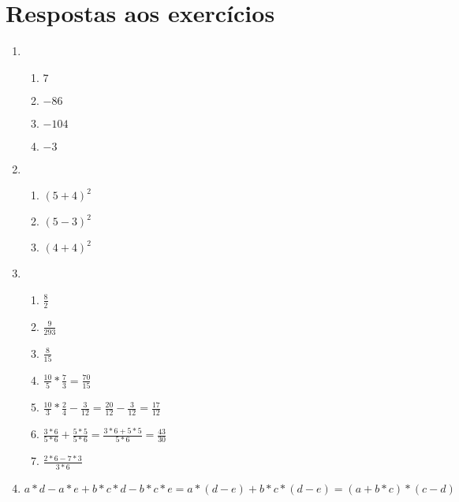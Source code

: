 \documentclass[11pt]{article}
\begin{document}
\section{Respostas aos exercícios}
\begin{enumerate}
	\item 
	\begin{enumerate}
		\item $7$
		\item $-86$
		\item $-104$
		\item $-3$
	\end{enumerate} 

	\item 
	\begin{enumerate}
		\item ${(5 + 4)}^2$
		\item ${(5 - 3)}^2$
		\item ${(4 + 4)}^2$
	\end{enumerate}

	\item
	\begin{enumerate}
		\item $\frac{8}{2}$
		\item $\frac{9}{293}$
		\item $\frac{8}{15}$
		\item $\frac{10}{5} * \frac{7}{3} = \frac{70}{15}$		
		\item $\frac{10}{3}*\frac{2}{4} - \frac{3}{12} = \frac{20}{12} - 
		\frac{3}{12} = \frac{17}{12}$
		\item $\frac{3*6}{5*6} + \frac{5*5}{5*6} = \frac{3*6+5*5}{5*6}
		= \frac{43}{30}$
		\item $\frac{2*6 - 7*3}{3*6}$
	\end{enumerate}

	\item $a*d - a*e + b*c*d - b*c*e = a*(d-e) + b*c*(d-e) = (a+b*c)*(c-d)$
\end{enumerate}
\end{document}
